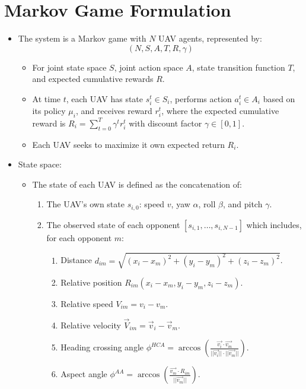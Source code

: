 \documentclass{article}
\begin{document}
\section*{Markov Game Formulation}
\begin{itemize}
    \item The system is a Markov game with $N$ UAV agents, represented by:
    \[
    (N, S, A, T, R, \gamma)
    \]
    \begin{itemize}
        \item For joint state space $S$, joint action space $A$, state transition function $T$, and expected cumulative rewards $R$.
        \item At time $t$, each UAV has state $s_i^t \in S_i$, performs action $a_i^t \in A_i$ based on its policy $\mu_i$, and
            receives reward $r_i^t$, where the expected cumulative reward is $R_i = \sum_{t=0}^T \gamma^t r_i^t$ with discount
            factor $\gamma \in [0, 1]$.
        \item Each UAV seeks to maximize it own expected return $R_i$.
    \end{itemize}
    \item State space:
    \begin{itemize}
        \item The state of each UAV is defined as the concatenation of:
        \begin{enumerate}
            \item The UAV's own state $s_{i, 0}$: speed $v$, yaw $\alpha$, roll $\beta$, and pitch $\gamma$.
            \item The observed state of each opponent $[s_{i, 1}, \ldots, s_{i, N-1}]$ which includes, for each opponent $m$:
            \begin{enumerate}
                \item Distance $d_{im} = \sqrt{(x_i - x_m)^2 + (y_i - y_m)^2 + (z_i - z_m)^2}$.
                \item Relative position $R_{im}(x_i - x_m, y_i - y_m, z_i - z_m)$.
                \item Relative speed $V_{im} = v_i - v_m$.
                \item Relative velocity $\vec{V}_{im} = \vec{v}_i - \vec{v}_m$.
                \item Heading crossing angle $\phi^{HCA} = \arccos(\frac{\vec{v_i} \cdot \vec{v_m}}{||\vec{v_i}|| \cdot ||\vec{v_m}||})$.
                \item Aspect angle $\phi^{AA} = \arccos(\frac{\vec{v_m} \cdot R_{im}}{||\vec{v_m}||})$.

\end{enumerate}
\end{enumerate}
\end{itemize}
\end{itemize}
\end{document}
